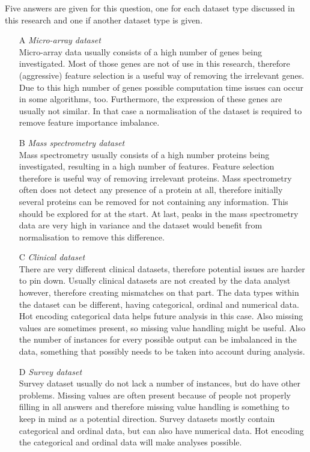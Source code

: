 \documentclass[10pt,a4paper]{report}
\begin{document}
	Five answers are given for this question, one for each dataset type discussed in this research and one if another dataset type is given.
	
	\begin{enumerate}
		\item[A] \textit{Micro-array dataset} \\
		Micro-array data usually consists of a high number of genes being investigated. Most of those genes are not of use in this research, therefore (aggressive) feature selection is a useful way of removing the irrelevant genes. Due to this high number of genes possible computation time issues can occur in some algorithms, too. Furthermore, the expression of these genes are usually not similar. In that case a normalisation of the dataset is required to remove feature importance imbalance.
		\item[B] \textit{Mass spectrometry dataset} \\
		Mass spectrometry usually consists of a high number proteins being investigated, resulting in a high number of features. Feature selection therefore is useful way of removing irrelevant proteins. Mass spectrometry often does not detect any presence of a protein at all, therefore initially several proteins can be removed for not containing any information. This should be explored for at the start. At last, peaks in the mass spectrometry data are very high in variance and the dataset would benefit from normalisation to remove this difference.
		\item[C] \textit{Clinical dataset} \\
		There are very different clinical datasets, therefore potential issues are harder to pin down. Usually clinical datasets are not created by the data analyst however, therefore creating mismatches on that part. The data types within the dataset can be different, having categorical, ordinal and numerical data. Hot encoding categorical data helps future analysis in this case. Also missing values are sometimes present, so missing value handling might be useful. Also the number of instances for every possible output can be imbalanced in the data, something that possibly needs to be taken into account during analysis.
		\item[D] \textit{Survey dataset} \\
		Survey dataset usually do not lack a number of instances, but do have other problems. Missing values are often present because of people not properly filling in all answers and therefore missing value handling is something to keep in mind as a potential direction. Survey datasets mostly contain categorical and ordinal data, but can also have numerical data. Hot encoding the categorical and ordinal data will make analyses possible.  
	\end{enumerate}
	
\end{document}
